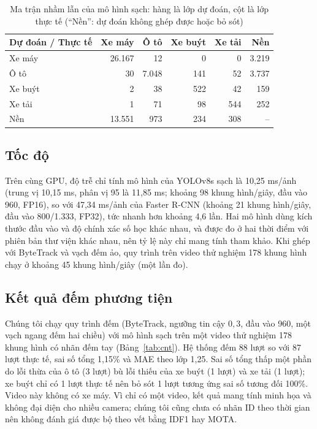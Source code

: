 \documentclass[10pt,journal,letterpaper]{IEEEtran}
\begin{document}
\begin{table}[!t]
\caption{Ma trận nhầm lẫn của mô hình sạch: hàng là lớp dự đoán, cột là lớp thực tế (``Nền'': dự đoán không ghép được hoặc bỏ sót)}
\label{tab:cm}
\centering
\footnotesize
\setlength{\tabcolsep}{3pt}
\begin{tabular}{lrrrrr}
\toprule
Dự đoán / Thực tế & Xe máy & Ô tô & Xe buýt & Xe tải & Nền \\
\midrule
Xe máy & 26.167 & 12 & 0 & 0 & 3.219 \\
Ô tô & 30 & 7.048 & 141 & 52 & 3.737 \\
Xe buýt & 2 & 38 & 522 & 42 & 159 \\
Xe tải & 1 & 71 & 98 & 544 & 252 \\
Nền & 13.551 & 973 & 234 & 308 & -- \\
\bottomrule
\end{tabular}
\end{table}

\subsection{Tốc độ}
Trên cùng GPU, độ trễ chỉ tính mô hình của YOLOv8s sạch là 10,25 ms/ảnh (trung vị 10,15 ms, phân vị 95 là 11,85 ms; khoảng 98 khung hình/giây, đầu vào 960, FP16), so với 47,34 ms/ảnh của Faster R-CNN (khoảng 21 khung hình/giây, đầu vào 800/1.333, FP32), tức nhanh hơn khoảng 4,6 lần. Hai mô hình dùng kích thước đầu vào và độ chính xác số học khác nhau, và được đo ở hai thời điểm với phiên bản thư viện khác nhau, nên tỷ lệ này chỉ mang tính tham khảo. Khi ghép với ByteTrack và vạch đếm ảo, quy trình trên video thử nghiệm 178 khung hình chạy ở khoảng 45 khung hình/giây (một lần đo).

\subsection{Kết quả đếm phương tiện}
Chúng tôi chạy quy trình đếm (ByteTrack, ngưỡng tin cậy $0{,}3$, đầu vào 960, một vạch ngang đếm hai chiều) với mô hình sạch trên một video thử nghiệm 178 khung hình có nhãn đếm tay (Bảng~\ref{tab:cnt}). Hệ thống đếm 88 lượt so với 87 lượt thực tế, sai số tổng 1,15\% và MAE theo lớp 1,25. Sai số tổng thấp một phần do lỗi thừa của ô tô (3 lượt) bù lỗi thiếu của xe buýt (1 lượt) và xe tải (1 lượt); xe buýt chỉ có 1 lượt thực tế nên bỏ sót 1 lượt tương ứng sai số tương đối 100\%. Video này không có xe máy. Vì chỉ có một video, kết quả mang tính minh họa và không đại diện cho nhiều camera; chúng tôi cũng chưa có nhãn ID theo thời gian nên không đánh giá được bộ theo vết bằng IDF1 hay MOTA.
\end{document}
